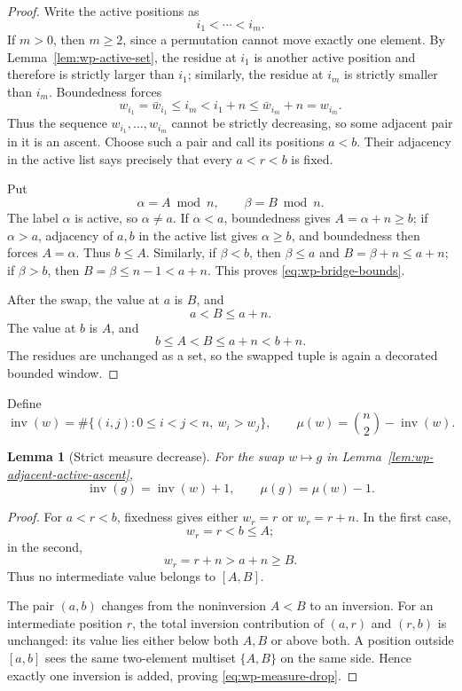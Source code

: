 \documentclass[11pt]{article}
\newtheorem{lemma}[theorem]{Lemma}
\theoremstyle{definition}
\begin{document}
\begin{proof}
Write the active positions as
\[
   i_1<\cdots<i_m.
\]
If \(m>0\), then \(m\ge2\), since a permutation cannot move exactly one
element. By Lemma~\ref{lem:wp-active-set}, the residue at \(i_1\) is another
active position and therefore is strictly larger than \(i_1\); similarly, the
residue at \(i_m\) is strictly smaller than \(i_m\). Boundedness forces
\[
   w_{i_1}=\bar w_{i_1}\le i_m
   <i_1+n\le \bar w_{i_m}+n=w_{i_m}.
\]
Thus the sequence \(w_{i_1},\ldots,w_{i_m}\) cannot be strictly decreasing,
so some adjacent pair in it is an ascent. Choose such a pair and call its
positions \(a<b\). Their adjacency in the active list says precisely that
every \(a<r<b\) is fixed.

Put
\[
   \alpha=A\bmod n,\qquad \beta=B\bmod n.
\]
The label \(\alpha\) is active, so \(\alpha\ne a\). If \(\alpha<a\), boundedness gives
\(A=\alpha+n\ge b\); if \(\alpha>a\), adjacency of \(a,b\) in the active list
gives \(\alpha\ge b\), and boundedness then forces \(A=\alpha\). Thus
\(b\le A\). Similarly, if \(\beta<b\), then \(\beta\le a\) and
\(B=\beta+n\le a+n\); if \(\beta>b\), then \(B=\beta\le n-1<a+n\).
This proves \eqref{eq:wp-bridge-bounds}.

After the swap, the value at \(a\) is \(B\), and
\[
   a<B\le a+n.
\]
The value at \(b\) is \(A\), and
\[
   b\le A<B\le a+n<b+n.
\]
The residues are unchanged as a set, so the swapped tuple is again a decorated
bounded window.
\end{proof}

Define
\begin{equation}
   \operatorname{inv}(w)
   =
   \#\{(i,j):0\le i<j<n,\ w_i>w_j\},
   \qquad
   \mu(w)=\binom n2-\operatorname{inv}(w).
   \label{eq:wp-measure}
\end{equation}

\begin{lemma}[Strict measure decrease]
\label{lem:wp-measure-decrease}
For the swap \(w\mapsto g\) in
Lemma~\ref{lem:wp-adjacent-active-ascent},
\begin{equation}
   \operatorname{inv}(g)=\operatorname{inv}(w)+1,
   \qquad
   \mu(g)=\mu(w)-1.
   \label{eq:wp-measure-drop}
\end{equation}
\end{lemma}

\begin{proof}
For \(a<r<b\), fixedness gives either \(w_r=r\) or \(w_r=r+n\). In the first
case,
\[
   w_r=r<b\le A;
\]
in the second,
\[
   w_r=r+n>a+n\ge B.
\]
Thus no intermediate value belongs to \([A,B]\).

The pair \((a,b)\) changes from the noninversion \(A<B\) to an inversion.
For an intermediate position \(r\), the total inversion contribution of
\((a,r)\) and \((r,b)\) is unchanged: its value lies either below both \(A,B\)
or above both. A position outside \([a,b]\) sees the same two-element multiset
\(\{A,B\}\) on the same side. Hence exactly one inversion is added, proving
\eqref{eq:wp-measure-drop}.
\end{proof}
\end{document}
